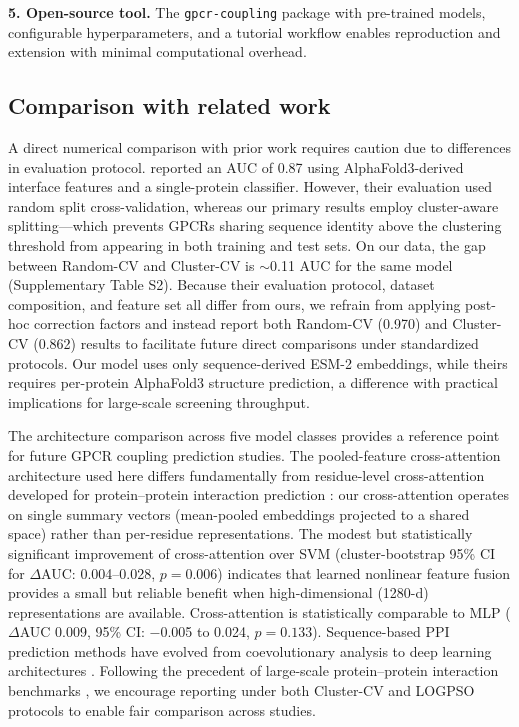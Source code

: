 \documentclass[11pt,a4paper]{article}
\begin{document}
\textbf{5. Open-source tool.} The \texttt{gpcr-coupling} package with pre-trained models, configurable hyperparameters, and a tutorial workflow enables reproduction and extension with minimal computational overhead.

\subsection{Comparison with related work}

A direct numerical comparison with prior work requires caution due to differences in evaluation protocol. \cite{miglionico2025predicting} reported an AUC of 0.87 using AlphaFold3-derived interface features and a single-protein classifier. However, their evaluation used random split cross-validation, whereas our primary results employ cluster-aware splitting---which prevents GPCRs sharing sequence identity above the clustering threshold from appearing in both training and test sets. On our data, the gap between Random-CV and Cluster-CV is $\sim$0.11 AUC for the same model (Supplementary Table S2). Because their evaluation protocol, dataset composition, and feature set all differ from ours, we refrain from applying post-hoc correction factors and instead report both Random-CV (0.970) and Cluster-CV (0.862) results to facilitate future direct comparisons under standardized protocols. Our model uses only sequence-derived ESM-2 embeddings, while theirs requires per-protein AlphaFold3 structure prediction, a difference with practical implications for large-scale screening throughput.

The architecture comparison across five model classes provides a reference point for future GPCR coupling prediction studies. The pooled-feature cross-attention architecture used here differs fundamentally from residue-level cross-attention developed for protein--protein interaction prediction \cite{sledzieski2021dscript}: our cross-attention operates on single summary vectors (mean-pooled embeddings projected to a shared space) rather than per-residue representations. The modest but statistically significant improvement of cross-attention over SVM (cluster-bootstrap 95\% CI for $\Delta$AUC: 0.004--0.028, $p = 0.006$) indicates that learned nonlinear feature fusion provides a small but reliable benefit when high-dimensional (1280-d) representations are available. Cross-attention is statistically comparable to MLP ($\Delta$AUC 0.009, 95\% CI: $-$0.005 to 0.024, $p = 0.133$). Sequence-based PPI prediction methods have evolved from coevolutionary analysis \cite{cong2019protein} to deep learning architectures \cite{hashemifar2018predicting,sledzieski2021dscript}. Following the precedent of large-scale protein--protein interaction benchmarks \cite{reim2025large}, we encourage reporting under both Cluster-CV and LOGPSO protocols to enable fair comparison across studies.
\end{document}
